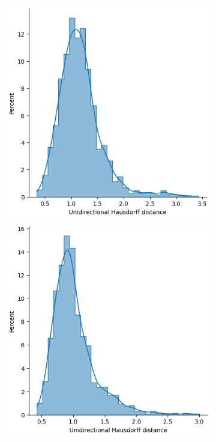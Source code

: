         \begin{figure}[htb]
          \centering
          \begin{subfigure}[t]{\textwidth+20pt\relax}
            \includegraphics[width=\dimexpr\linewidth-20pt\relax]{figures/dropcon/all_udhs.png}
            \includegraphics[width=\dimexpr\linewidth-20pt\relax]{figures/dropout/all_udhs.png}

\end{subfigure}
\end{figure}
